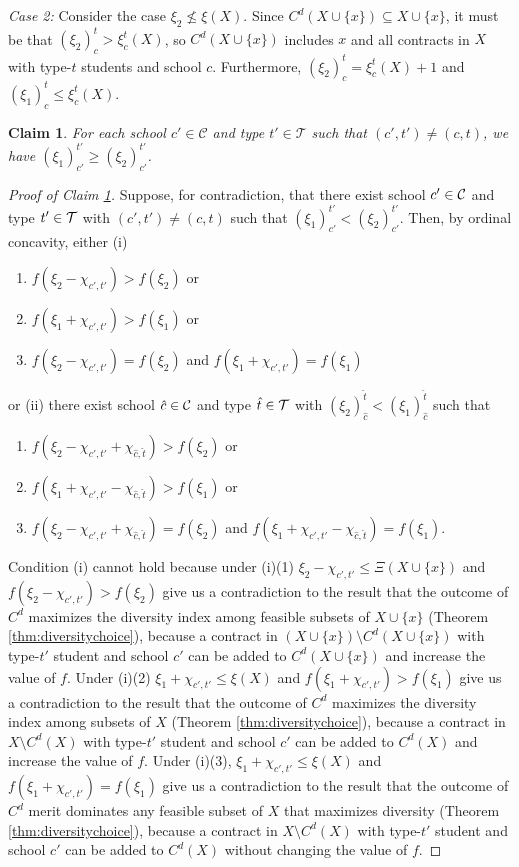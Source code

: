 \documentclass[12pt]{amsart}
\newtheorem{claim}{Claim}
\theoremstyle{remark}
\begin{document}
\smallskip
\emph{Case 2:} Consider the case $\xi_2 \not \leq \xi(X)$. Since $C^d(X\cup \{x\})\subseteq X\cup \{x\}$,
it must be that $(\xi_2)^t_c> \xi^t_c(X)$, so $C^d(X\cup \{x\})$ includes $x$ and all
contracts in $X$ with type-$t$ students and school $c$. Furthermore, $(\xi_2)^t_c=\xi^t_c(X)+1$ and
$(\xi_1)^t_c\leq \xi^t_c(X)$.

\begin{claim}\label{claim:types}
For each school $c'\in \mathcal{C}$ and type $t'\in \mathcal{T}$ such that $(c',t') \neq (c,t)$, we have $(\xi_1)^{t'}_{c'}\geq (\xi_2)^{t'}_{c'}$.
\end{claim}

\begin{proof}[Proof of Claim \ref{claim:types}]\renewcommand{\qedsymbol}{$\blacksquare$}
Suppose, for contradiction, that there exist school $c'\in \mathcal{C}$ and type $t'\in \mathcal{T}$ with $(c',t') \neq (c,t)$
such that $(\xi_1)^{t'}_{c'} < (\xi_2)^{t'}_{c'}$. Then, by ordinal concavity,
either (i)
\begin{enumerate}
\item $f(\xi_2-\chi_{c',t'})>f(\xi_2)$ or
\item $f(\xi_1+\chi_{c',t'})>f(\xi_1)$ or
\item $f(\xi_2-\chi_{c',t'})=f(\xi_2)$ and $f(\xi_1+\chi_{c',t'})=f(\xi_1)$
\end{enumerate}
or (ii) there exist school $\hat c\in \mathcal{C}$ and type $\hat t\in \mathcal{T}$  with
$(\xi_2)_{\hat c}^{\hat t}<(\xi_1)_{\hat c}^{\hat t}$ such that
\begin{enumerate}
\item $f(\xi_2-\chi_{c',t'}+\chi_{\hat c, \hat t})>f(\xi_2)$ or
\item $f(\xi_1+\chi_{c',t'}-\chi_{\hat c, \hat t})>f(\xi_1)$ or
\item $f(\xi_2-\chi_{c',t'}+\chi_{\hat c, \hat t})=f(\xi_2)$ and $f(\xi_1+\chi_{c',t'}-\chi_{\hat c, \hat t}) = f(\xi_1)$.
\end{enumerate}
Condition (i) cannot hold because under (i)(1) $\xi_2-\chi_{c',t'}\leq \Xi(X\cup \{x\})$ and
$f(\xi_2-\chi_{c',t'})>f(\xi_2)$ give us a contradiction to the result that the outcome of $C^d$
maximizes the diversity index among feasible subsets of $X\cup \{x\}$ (Theorem \ref{thm:diversitychoice}),
because a contract in $(X\cup \{x\}) \setminus C^d(X\cup \{x\})$ with type-$t'$ student and
school $c'$ can be added to $C^d(X\cup \{x\})$ and increase the value of $f$.
Under (i)(2) $\xi_1+\chi_{c',t'} \leq \xi(X)$ and $f(\xi_1+\chi_{c',t'}) > f(\xi_1)$ give us a contradiction to the result that the outcome of $C^d$ maximizes the diversity index among subsets of $X$ (Theorem \ref{thm:diversitychoice}), because a
contract in $X\setminus C^d(X)$ with type-$t'$ student and
school $c'$ can be added to $C^d(X)$ and increase the value of $f$. Under (i)(3),
$\xi_1+\chi_{c',t'} \leq \xi(X)$ and $f(\xi_1+\chi_{c',t'})=f(\xi_1)$ give us a contradiction to the result that the outcome of $C^d$ merit dominates any
feasible subset of $X$ that maximizes diversity
(Theorem \ref{thm:diversitychoice}), because a contract in $X\setminus C^d(X)$ with type-$t'$ student and
school $c'$ can be added to $C^d(X)$ without changing the value of $f$.


\end{proof}
\end{document}
